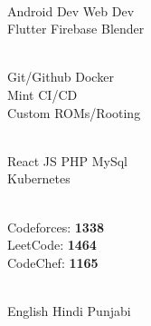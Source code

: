 \documentclass[]{deedy-resume-openfont}
\begin{document}
\begin{minipage}[t]{0.33\textwidth}
 \\
\textbullet{} Android Dev \textbullet{} Web Dev \\ \textbullet{} Flutter \textbullet{} Firebase \textbullet{} Blender \\
\sectionsep

 \\
\textbullet{} Git/Github \textbullet{} Docker \\ \textbullet{} Mint \textbullet{} CI/CD \\ \textbullet{} Custom ROMs/Rooting \\
\sectionsep

 \\
\textbullet{} React JS \textbullet{} PHP \textbullet{} MySql \\ \textbullet{} Kubernetes
\sectionsep

 \\
\textbullet{} Codeforces: \textbf{1338} \\
\textbullet{} LeetCode: \textbf{1464} \\
\textbullet{} CodeChef: \textbf{1165} \\
\sectionsep

 \\
\textbullet{} English \textbullet{} Hindi \textbullet{} Punjabi
\sectionsep

%
%

\end{minipage} 
\hfill
\end{document}
